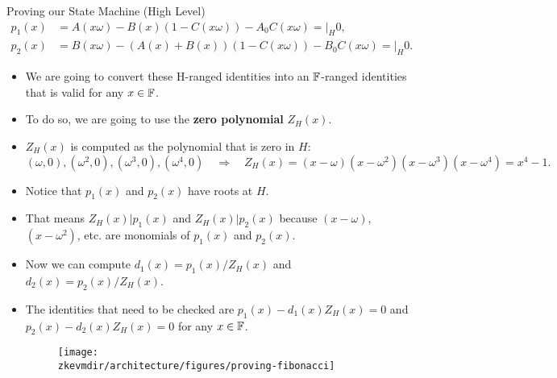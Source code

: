 \begin{frame}[allowframebreaks]{Proving our State Machine (High Level)}
\begin{align*}
p_1(x)&= A(x\omega) - B(x)(1 - C(x\omega)) - A_0C(x\omega) = \bigg\lvert_H 0,\\
p_2(x) &= B(x\omega) - (A(x) + B(x))(1 - C(x\omega)) - B_0 C(x\omega) = \bigg\lvert_H 0.
\end{align*}

\begin{itemize}
\item We are going to convert these H-ranged identities into an $\mathbb{F}$-ranged identities that 
is valid for any $x \in \mathbb{F}$.
\item To do so, we are going to use the \textbf{zero polynomial} $Z_H(x)$.
\item $Z_H(x)$ is computed as the polynomial that is zero in $H$:
\[
(\omega,0), (\omega^2,0), (\omega^3,0), (\omega^4,0) \quad \Longrightarrow \quad Z_H(x) = (x-\omega)(x-\omega^2)(x-\omega^3)(x-\omega^4) = x^4-1.
\]
\item Notice that $p_1(x)$ and $p_2(x)$ have roots at $H$.
\item That means $Z_H(x) | p_1(x)$ and $Z_H(x) | p_2(x)$ 
because $(x-\omega)$, $(x-\omega^2)$, etc. are monomials of $p_1(x)$ and  $p_2(x)$.
\item Now we can compute $d_1(x) = p_1(x) / Z_H(x)$ and $d_2(x) = p_2(x) / Z_H(x)$.
\item The identities that need to be checked are $p_1(x) - d_1(x)Z_H(x) = 0$ and $p_2(x) - d_2(x)Z_H(x) = 0$ 
for any $x \in \mathbb{F}$.

\vspace{0.15cm}
\begin{figure}
\texttt{[image: \\zkevmdir/architecture/figures/proving-fibonacci]}
\end{figure}
\end{itemize}
\end{frame}
